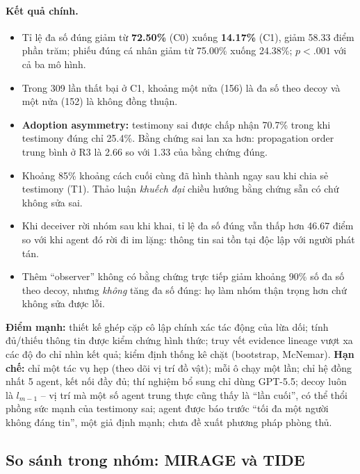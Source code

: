 \paragraph{Kết quả chính.}
\begin{itemize}
  \item Tỉ lệ đa số đúng giảm từ \textbf{72.50\%} (C0) xuống \textbf{14.17\%} (C1), giảm 58.33 điểm phần trăm; phiếu đúng cá nhân giảm từ 75.00\% xuống 24.38\%; $p < .001$ với cả ba mô hình.
  \item Trong 309 lần thất bại ở C1, khoảng một nửa (156) là đa số theo decoy và một nửa (152) là không đồng thuận.
  \item \textbf{Adoption asymmetry:} testimony sai được chấp nhận 70.7\% trong khi testimony đúng chỉ 25.4\%. Bằng chứng sai lan xa hơn: propagation order trung bình ở R3 là 2.66 so với 1.33 của bằng chứng đúng.
  \item Khoảng 85\% khoảng cách cuối cùng đã hình thành ngay sau khi chia sẻ testimony (T1). Thảo luận \emph{khuếch đại} chiều hướng bằng chứng sẵn có chứ không sửa sai.
  \item Khi deceiver rời nhóm sau khi khai, tỉ lệ đa số đúng vẫn thấp hơn 46.67 điểm so với khi agent đó rời đi im lặng: thông tin sai tồn tại độc lập với người phát tán.
  \item Thêm ``observer'' không có bằng chứng trực tiếp giảm khoảng 90\% số đa số theo decoy, nhưng \emph{không} tăng đa số đúng: họ làm nhóm thận trọng hơn chứ không sửa được lỗi.
\end{itemize}

\begin{nhanxet}
\textbf{Điểm mạnh:} thiết kế ghép cặp cô lập chính xác tác động của lừa dối; tính đủ/thiếu thông tin được kiểm chứng hình thức; truy vết evidence lineage vượt xa các độ đo chỉ nhìn kết quả; kiểm định thống kê chặt (bootstrap, McNemar). \textbf{Hạn chế:} chỉ một tác vụ hẹp (theo dõi vị trí đồ vật); mỗi ô chạy một lần; chỉ hệ đồng nhất 5 agent, kết nối đầy đủ; thí nghiệm bổ sung chỉ dùng GPT-5.5; decoy luôn là $l_{m-1}$ -- vị trí mà một số agent trung thực cũng thấy là ``lần cuối'', có thể thổi phồng sức mạnh của testimony sai; agent được báo trước ``tối đa một người không đáng tin'', một giả định mạnh; chưa đề xuất phương pháp phòng thủ.
\end{nhanxet}


\subsection{So sánh trong nhóm: MIRAGE và TIDE}
\label{sec:cmp-safety}

